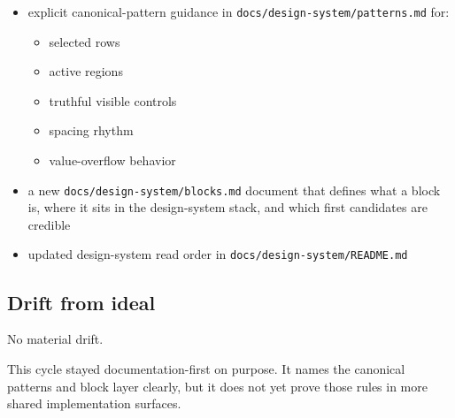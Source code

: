 \begin{itemize}
\tightlist
\item
  explicit canonical-pattern guidance in \texttt{d\allowbreak{}o\allowbreak{}c\allowbreak{}s\allowbreak{}/\allowbreak{}d\allowbreak{}e\allowbreak{}s\allowbreak{}i\allowbreak{}g\allowbreak{}n\allowbreak{}-\allowbreak{}s\allowbreak{}y\allowbreak{}s\allowbreak{}t\allowbreak{}e\allowbreak{}m\allowbreak{}/\allowbreak{}p\allowbreak{}a\allowbreak{}t\allowbreak{}t\allowbreak{}e\allowbreak{}r\allowbreak{}n\allowbreak{}s\allowbreak{}.\allowbreak{}m\allowbreak{}d} for:

  \begin{itemize}
  \tightlist
  \item
    selected rows
  \item
    active regions
  \item
    truthful visible controls
  \item
    spacing rhythm
  \item
    value-overflow behavior
  \end{itemize}
\item
  a new \texttt{d\allowbreak{}o\allowbreak{}c\allowbreak{}s\allowbreak{}/\allowbreak{}d\allowbreak{}e\allowbreak{}s\allowbreak{}i\allowbreak{}g\allowbreak{}n\allowbreak{}-\allowbreak{}s\allowbreak{}y\allowbreak{}s\allowbreak{}t\allowbreak{}e\allowbreak{}m\allowbreak{}/\allowbreak{}b\allowbreak{}l\allowbreak{}o\allowbreak{}c\allowbreak{}k\allowbreak{}s\allowbreak{}.\allowbreak{}m\allowbreak{}d} document that defines what a block is, where it sits in the design-system stack, and which first candidates are credible
\item
  updated design-system read order in \texttt{d\allowbreak{}o\allowbreak{}c\allowbreak{}s\allowbreak{}/\allowbreak{}d\allowbreak{}e\allowbreak{}s\allowbreak{}i\allowbreak{}g\allowbreak{}n\allowbreak{}-\allowbreak{}s\allowbreak{}y\allowbreak{}s\allowbreak{}t\allowbreak{}e\allowbreak{}m\allowbreak{}/\allowbreak{}R\allowbreak{}E\allowbreak{}A\allowbreak{}D\allowbreak{}M\allowbreak{}E\allowbreak{}.\allowbreak{}m\allowbreak{}d}
\end{itemize}

\subsection{Drift from ideal}\label{record-169-drift-from-ideal}

No material drift.

This cycle stayed documentation-first on purpose. It names the canonical patterns and block layer clearly, but it does not yet prove those rules in more shared implementation surfaces.


